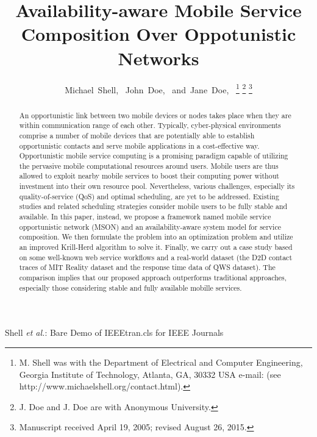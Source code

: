 \documentclass[journal]{IEEEtran}
\begin{document}
\title{Availability-aware Mobile Service Composition Over Oppotunistic Networks}

\author{Michael~Shell,~
        John~Doe,~
        and~Jane~Doe,~%
\thanks{M. Shell was with the Department
of Electrical and Computer Engineering, Georgia Institute of Technology, Atlanta,
GA, 30332 USA e-mail: (see http://www.michaelshell.org/contact.html).}%
\thanks{J. Doe and J. Doe are with Anonymous University.}%
\thanks{Manuscript received April 19, 2005; revised August 26, 2015.}}

%
{Shell \MakeLowercase{\textit{et al.}}: Bare Demo of IEEEtran.cls for IEEE Journals}


\maketitle

\begin{abstract}
An opportunistic link between two mobile devices or nodes takes place when they are within communication range of each other. Typically, cyber-physical environments comprise a number of mobile devices that are potentially able to establish opportunistic contacts and serve mobile applications in a cost-effective way.
Opportunistic mobile service computing is a promising paradigm capable of utilizing the pervasive mobile computational resources around users. Mobile users are thus allowed to exploit nearby mobile services to boost their computing power without investment into their own resource pool. 
Nevertheless, various challenges, especially its quality-of-service (QoS) and optimal scheduling, are yet to be addressed. Existing studies and related scheduling strategies consider mobile users to be fully stable and available.
In this paper, instead, we propose a framework named mobile service opportunistic network (MSON) and an availability-aware system model for service composition. 
We then formulate the problem into an optimization problem and utilize an improved Krill-Herd algorithm to solve it.
Finally, we carry out a case study based on some well-known web service workflows and a real-world dataset (the D2D contact traces of MIT Reality dataset and the response time data of QWS dataset). The comparison implies that our proposed approach outperforms traditional approaches, especially those considering stable and fully available mobille services.
\end{abstract}
\end{document}
